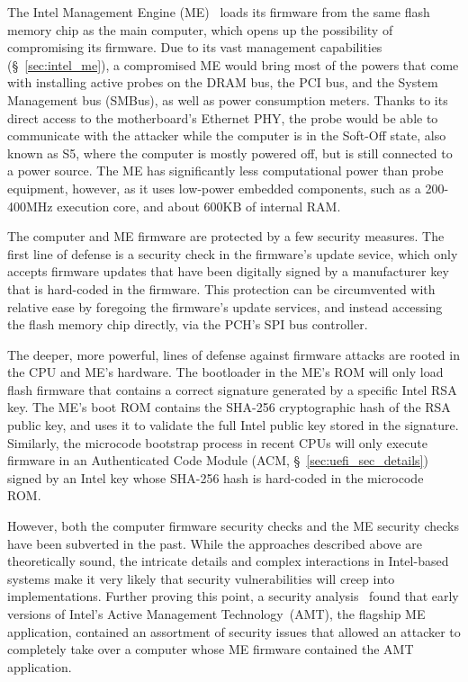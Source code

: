 The Intel Management Engine (ME)~\cite{ruan2014intelme} loads its firmware
from the same flash memory chip as the main computer, which opens up the
possibility of compromising its firmware. Due to its vast management
capabilities (\S~\ref{sec:intel_me}), a compromised ME would bring most of the
powers that come with installing active probes on the DRAM bus, the PCI bus,
and the System Management bus (SMBus), as well as power consumption meters.
Thanks to its direct access to the motherboard's Ethernet PHY, the probe would
be able to communicate with the attacker while the computer is in the Soft-Off
state, also known as S5, where the computer is mostly powered off, but is still
connected to a power source.  The ME has significantly less computational power
than probe equipment, however, as it uses low-power embedded components, such
as a 200-400MHz execution core, and about 600KB of internal RAM.

The computer and ME firmware are protected by a few security measures. The
first line of defense is a security check in the firmware's update sevice,
which only accepts firmware updates that have been digitally signed by a
manufacturer key that is hard-coded in the firmware. This protection can be
circumvented with relative ease by foregoing the firmware's update services,
and instead accessing the flash memory chip directly, via the PCH's SPI bus
controller.

The deeper, more powerful, lines of defense against firmware attacks are rooted
in the CPU and ME's hardware. The bootloader in the ME's ROM will only load
flash firmware that contains a correct signature generated by a specific Intel
RSA key. The ME's boot ROM contains the SHA-256 cryptographic hash of the RSA
public key, and uses it to validate the full Intel public key stored in the
signature. Similarly, the microcode bootstrap process in recent CPUs will only
execute firmware in an Authenticated Code Module
(ACM, \S~\ref{sec:uefi_sec_details}) signed by an Intel key whose SHA-256 hash
is hard-coded in the microcode ROM.

However, both the computer firmware security checks \cite{wojtczuk2010bios,
furtak2014bios} and the ME security checks \cite{tereshkin2009amt} have been
subverted in the past. While the approaches described above are theoretically
sound, the intricate details and complex interactions in Intel-based systems
make it very likely that security vulnerabilities will creep into
implementations. Further proving this point, a security
analysis~\cite{ververis2010security} found that early versions of Intel's
Active Management Technology~(AMT), the flagship ME application, contained an
assortment of security issues that allowed an attacker to completely take over
a computer whose ME firmware contained the AMT application.

